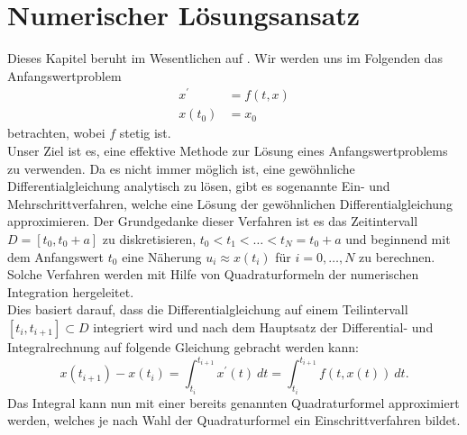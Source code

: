 \section{Numerischer Lösungsansatz}
\label{sec:numeric}
Dieses Kapitel beruht im Wesentlichen auf \cite{deuflhardNumerischeMathematikGewohnliche2013,
hairerSolvingOrdinaryDifferential, stoerNumerischeMathematik2005}. Wir werden uns im
Folgenden das Anfangswertproblem
\begin{align}
    \label{first-order-num}
    x^{\prime} &= f(t,x) \nonumber \\
    x(t_0) &= x_0
\end{align}
betrachten, wobei $f$ stetig ist.\\
Unser Ziel ist es, eine effektive Methode zur Lösung eines Anfangswertproblems zu verwenden.
Da es nicht immer möglich ist, eine gewöhnliche Differentialgleichung analytisch zu lösen, gibt es sogenannte Ein- und
Mehrschrittverfahren, welche eine Lösung der gewöhnlichen Differentialgleichung approximieren.
Der Grundgedanke dieser Verfahren ist es das Zeitintervall \linebreak $D=[t_0,t_{0}+a]$ zu diskretisieren,
$t_0 < t_1 < \dots < t_N = t_{0}+a$ und beginnend mit dem Anfangswert $t_0$ eine Näherung $u_i \approx x(t_i)$ für
$i=0, \dots, N$ zu berechnen. Solche Verfahren werden mit Hilfe von Quadraturformeln der numerischen Integration
\cite[Numerische Integration]{walzLexikonMathematik2017} hergeleitet.\\
Dies basiert darauf, dass die Differentialgleichung auf einem Teilintervall $[t_i, t_{i+1}] \subset D$
integriert wird und nach dem Hauptsatz der Differential- und Integralrechnung auf folgende Gleichung gebracht werden kann:
\[
    x(t_{i+1}) - x(t_i) = \int_{t_i}^{t_{i+1}} x^{\prime}(t)\ dt = \int_{t_i}^{t_{i+1}}f(t, x(t))\ dt.
\]
Das Integral kann nun mit einer bereits genannten Quadraturformel approximiert werden, welches je nach Wahl der
Quadraturformel ein Einschrittverfahren bildet.
